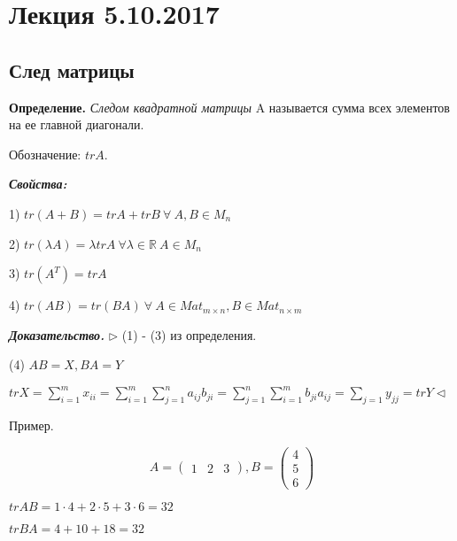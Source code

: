 \section{Лекция 5.10.2017}

\subsection{След матрицы}

\textbf{Определение.} \textit{Следом квадратной матрицы} A называется сумма всех элементов на ее главной диагонали.

Обозначение: $trA$.

\vspace{\baselineskip}
\textbf{\textit{Свойства:}}

1) $tr(A + B) = trA + trB \ \forall \ A, B \in M_n$

\vspace{\baselineskip}
2) $tr(\lambda A) = \lambda trA \ \forall \lambda \in \mathbb{R} \ A \in M_n$

\vspace{\baselineskip}
3) $tr(A^T) = trA$

\vspace{\baselineskip}
4) $tr(AB) = tr(BA) \ \forall \ A \in Mat_{m \times n}, B \in Mat_{n \times m}$

\vspace{\baselineskip}
\textbf{\textit{Доказательство.}} $\rhd$ (1) - (3) из определения.

(4) $AB = X, BA = Y$

$trX = \sum\limits_{i = 1}^m x_{ii} = \sum\limits_{i = 1}^m \sum\limits_{j = 1}^n a_{ij} b_{ji} = \sum\limits_{j = 1}^n \sum\limits_{i = 1}^m b_{ji} a_{ij} = \sum\limits_{j = 1} y_{jj} = trY \lhd$

\vspace{\baselineskip}
Пример.

\begin{equation*}A = \begin{pmatrix} 1 & 2 & 3 \end{pmatrix}, B = \begin{pmatrix} 4 \\ 5 \\ 6 \end{pmatrix} \end{equation*}

$trAB = 1 \cdot 4 + 2 \cdot 5 + 3 \cdot 6 = 32$

$trBA = 4 + 10 + 18 = 32$

